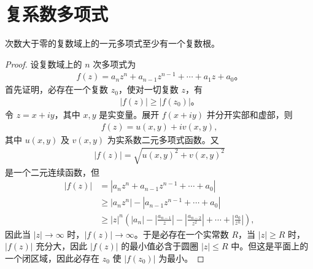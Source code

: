 \documentclass[../../main.tex]{subfiles}
\begin{document}
\section{复系数多项式}

\begin{theorem}[代数基本定理]\label{theorem:代数基本定理}
次数大于零的复数域上的一元多项式至少有一个复数根。
\end{theorem}
\begin{proof}
设复数域上的 $n$ 次多项式为
\begin{align}
f(z) = a_n z^n + a_{n-1} z^{n-1} + \cdots + a_1 z + a_0。 \label{theorem5.14-5.6.1}
\end{align}
首先证明，必存在一个复数 $z_0$，使对一切复数 $z$，有
\begin{align*}
|f(z)| \geqslant  |f(z_0)|。
\end{align*}
令 $z = x + iy$，其中 $x, y$ 是实变量。展开 $f(x + iy)$ 并分开实部和虚部，则
\begin{align*}
f(z) = u(x, y) + iv(x, y),
\end{align*}
其中 $u(x, y)$ 及 $v(x, y)$ 为实系数二元多项式函数。又
\begin{align*}
|f(z)| = \sqrt{u(x, y)^2 + v(x, y)^2}
\end{align*}
是一个二元连续函数，但
\begin{align*}
|f(z)| &= |a_n z^n + a_{n-1} z^{n-1} + \cdots + a_0| \\
&\geqslant  |a_n z^n| - |a_{n-1} z^{n-1} + \cdots + a_0| \\
&\geqslant  |z|^n \left( |a_n| - \left| \frac{a_{n-1}}{z} \right| - \left| \frac{a_{n-2}}{z^2} \right| + \cdots + \left| \frac{a_0}{z^n} \right| \right),
\end{align*}
因此当 $|z| \to \infty$ 时，$|f(z)| \to \infty$。于是必存在一个实常数 $R$，当 $|z| \geqslant  R$ 时，$|f(z)|$ 充分大，因此 $|f(z)|$ 的最小值必含于圆圈 $|z| \leqslant  R$ 中。但这是平面上的一个闭区域，因此必存在 $z_0$ 使 $|f(z_0)|$ 为最小。


\end{proof}
\end{document}
